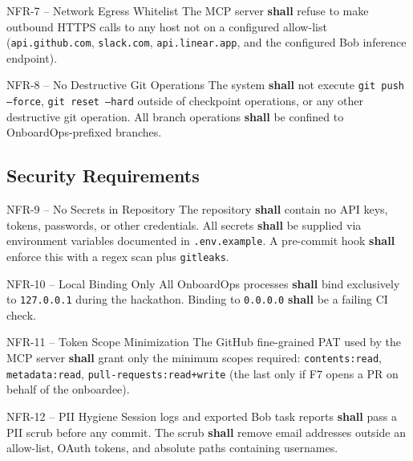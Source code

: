 \documentclass[11pt,letterpaper]{article}
\newcommand{\shall}{\textbf{shall}}
\begin{document}
\begin{reqbox}{NFR-7 -- Network Egress Whitelist}
The MCP server \shall{} refuse to make outbound HTTPS calls to any host not on a configured allow-list (\texttt{api.github.com}, \texttt{slack.com}, \texttt{api.linear.app}, and the configured Bob inference endpoint).
\end{reqbox}

\begin{reqbox}{NFR-8 -- No Destructive Git Operations}
The system \shall{} not execute \texttt{git push --force}, \texttt{git reset --hard} outside of checkpoint operations, or any other destructive git operation. All branch operations \shall{} be confined to OnboardOps-prefixed branches.
\end{reqbox}

\subsection{Security Requirements}

\begin{reqbox}{NFR-9 -- No Secrets in Repository}
The repository \shall{} contain no API keys, tokens, passwords, or other credentials. All secrets \shall{} be supplied via environment variables documented in \texttt{.env.example}. A pre-commit hook \shall{} enforce this with a regex scan plus \texttt{gitleaks}.
\end{reqbox}

\begin{reqbox}{NFR-10 -- Local Binding Only}
All OnboardOps processes \shall{} bind exclusively to \texttt{127.0.0.1} during the hackathon. Binding to \texttt{0.0.0.0} \shall{} be a failing CI check.
\end{reqbox}

\begin{reqbox}{NFR-11 -- Token Scope Minimization}
The GitHub fine-grained PAT used by the MCP server \shall{} grant only the minimum scopes required: \texttt{contents:read}, \texttt{metadata:read}, \texttt{pull-requests:read+write} (the last only if F7 opens a PR on behalf of the onboardee).
\end{reqbox}

\begin{reqbox}{NFR-12 -- PII Hygiene}
Session logs and exported Bob task reports \shall{} pass a PII scrub before any commit. The scrub \shall{} remove email addresses outside an allow-list, OAuth tokens, and absolute paths containing usernames.
\end{reqbox}
\end{document}
